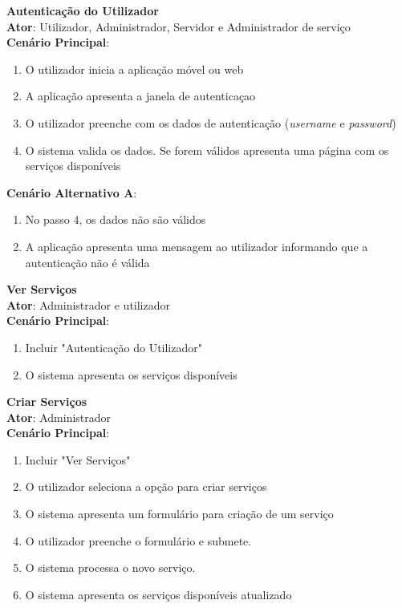 {\large\textbf{Autenticação do Utilizador}} \\
\textbf{Ator}: Utilizador, Administrador, Servidor e Administrador de serviço \\
\textbf{Cenário Principal}:

\begin{enumerate}[nolistsep]
	\item O utilizador inicia a aplicação móvel ou web
	\item A aplicação apresenta a janela de autenticaçao
	\item O utilizador preenche com os dados de autenticação (\textit{username} e \textit{password})
	\item O sistema valida os dados. Se forem válidos apresenta uma página com os serviços disponíveis
\end{enumerate}

\textbf{Cenário Alternativo A}:
\begin{enumerate}[nolistsep]
	\item No passo 4, os dados não são válidos
	\item A aplicação apresenta uma mensagem ao utilizador informando que a autenticação não é válida
\end{enumerate}

{\large\textbf{Ver Serviços}} \\
\textbf{Ator}: Administrador e utilizador \\
\textbf{Cenário Principal}:

\begin{enumerate}[nolistsep]
	\item Incluir "Autenticação do Utilizador"
	\item O sistema apresenta os serviços disponíveis
\end{enumerate}

{\large\textbf{Criar Serviços}} \\
\textbf{Ator}: Administrador  \\
\textbf{Cenário Principal}:

\begin{enumerate}[nolistsep]
	\item Incluir "Ver Serviços"
	\item O utilizador seleciona a opção para criar serviços
	\item O sistema apresenta um formulário para criação de um serviço
	\item O utilizador preenche o formulário e submete.
	\item O sistema processa o novo serviço.
	\item O sistema apresenta os serviços disponíveis atualizado 
\end{enumerate}

